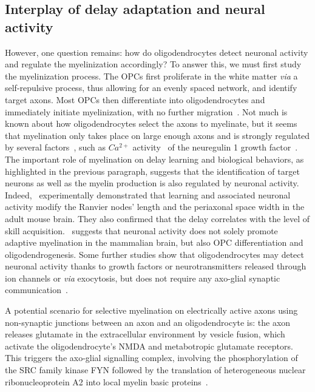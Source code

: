 \documentclass[brainsci, %
               review,submit,pdftex,moreauthors
               ]{Definitions/mdpi}
\begin{document}
\subsection{Interplay of delay adaptation and neural activity}
However, one question remains: how do oligodendrocytes detect neuronal activity and regulate the myelinization accordingly? To answer this, we must first study the myelinization process. The OPCs first proliferate in the white matter \emph{via} a self-repulsive process, thus allowing for an evenly spaced network, and identify target axons. Most OPCs then differentiate into oligodendrocytes and immediately initiate myelinization, with no further migration~\citep{simons_oligodendrocytes_2016}. Not much is known about how oligodendrocytes select the axons to myelinate, but it seems that myelination only takes place on large enough axons and is strongly regulated by several factors~\citep{kuhn_oligodendrocytes_2019}, such as $Ca^{2+}$ activity~\citep{baraban_ca2_2018} of the neuregulin 1 growth factor~\citep{nave_axonal_2006}. The important role of myelination on delay learning and biological behaviors, as highlighted in the previous paragraph, suggests that the identification of target neurons as well as the myelin production is also regulated by neuronal activity. Indeed,~\citet{cullen_periaxonal_2021} experimentally demonstrated that learning and associated neuronal activity modify the Ranvier nodes' length and the periaxonal space width in the adult mouse brain. They also confirmed that the delay correlates with the level of skill acquisition.~\citet{gibson_neuronal_2014} suggests that neuronal activity does not solely promote adaptive myelination in the mammalian brain, but also OPC differentiation and oligodendrogenesis. Some further studies show that oligodendrocytes may detect neuronal activity thanks to growth factors or neurotransmitters released through ion channels or \emph{via} exocytosis, but does not require any axo-glial synaptic communication~\citep{fields_new_2015}. 

A potential scenario for selective myelination on electrically active axons using non-synaptic junctions between an axon and an oligodendrocyte is: the axon releases glutamate in the extracellular environment by vesicle fusion, which activate the oligodendrocyte's NMDA and metabotropic glutamate receptors. This triggers the axo-glial signalling complex, involving the phosphorylation of the SRC family kinase FYN followed by the translation of heterogeneous nuclear ribonucleoprotein A2 into local myelin basic proteins~\citep{fields_new_2015}.
\end{document}
